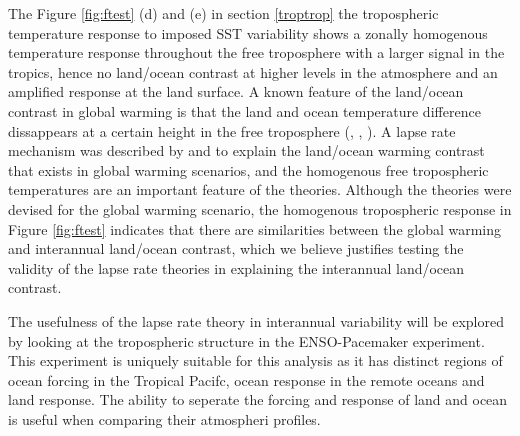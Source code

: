 The Figure \ref{fig:ftest} (d) and (e) in section \ref{troptrop} the 
tropospheric temperature response to imposed SST variability shows a zonally 
homogenous temperature response throughout the free troposphere with a larger 
signal in the tropics, hence no land/ocean contrast at higher levels in the 
atmosphere and an amplified response at the land surface.  A known feature of 
the land/ocean contrast in global warming is that the land and ocean temperature 
difference dissappears at a certain height in the free troposphere 
(\citealt{Joshi2007}, \citealt{Dommenget2009}, \citealt{Byrne2013a}). A lapse rate 
mechanism was described by \citet{Joshi2007} and \citet{Byrne2013a} to explain 
the land/ocean warming contrast that exists in global warming scenarios, and  
the homogenous free tropospheric temperatures are an important feature of the 
theories. Although the theories were devised for the global warming scenario, 
the homogenous tropospheric response in Figure \ref{fig:ftest} indicates that 
there are similarities between the global warming and interannual land/ocean 
contrast, which we believe justifies testing the validity of the lapse rate 
theories in explaining the interannual land/ocean contrast. 

The usefulness of the lapse rate theory in interannual variability will be 
explored by looking at the tropospheric structure in the ENSO-Pacemaker 
experiment. This experiment is uniquely suitable for this analysis as it has  
distinct regions of ocean forcing in the Tropical Pacifc, ocean response in the 
remote oceans and land response. The ability to seperate the forcing and 
response of land and ocean is useful when comparing their atmospheri profiles.


% 


